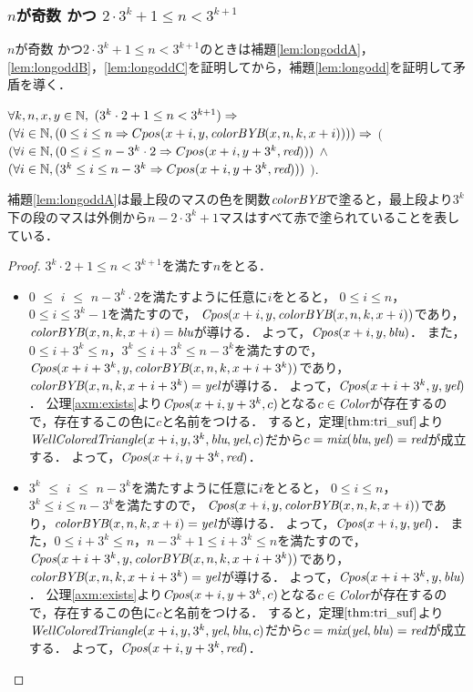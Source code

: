 \subsubsection{$n$が奇数 かつ $2 \cdot 3^{k} + 1 \leq n < 3^{k+1}$}
$n$が奇数 かつ$2 \cdot 3^{k} + 1 \leq n < 3^{k+1}$のときは補題\ref{lem:longoddA}，\ref{lem:longoddB}，\ref{lem:longoddC}を証明してから，補題\ref{lem:longodd}を証明して矛盾を導く．
\begin{lem}[\LongOddA] \label{lem:longoddA}
  $\forall k,n,x,y \in \mathbb{N},$
  $(3^k\cdot2 + 1 \leq n < 3^{k+1}) \Rightarrow$
  $(\forall i \in \mathbb{N},(0 \leq i \leq n \Rightarrow Cpos(x+i,y,\textit{colorBYB}(x,n,k,x+i)))) \Rightarrow$ 
      $($
        $(\forall i \in \mathbb{N},(0 \leq i \leq n - 3^k\cdot2 \Rightarrow Cpos(x+i,y+3^k,\textit{red})))$
        $\land$
        $(\forall i \in \mathbb{N},(3^k \leq i \leq n - 3^k \Rightarrow Cpos(x+i,y+3^k,\textit{red})))$
      $)$.
\end{lem}
補題\ref{lem:longoddA}は最上段のマスの色を関数$\textit{colorBYB}$で塗ると，最上段より$3^k$下の段のマスは外側から$n-2\cdot3^k+1$マスはすべて赤で塗られていることを表している．
\begin{proof}
  $3^k\cdot2 + 1 \leq n < 3^{k+1}$を満たす$n$をとる．
  \begin{itemize}
  \item
    $0$ $\leq$ $i$ $\leq$ $n - 3^k \cdot 2$を満たすように任意に$i$をとると，
    $0 \leq i \leq n$，$0 \leq i \leq 3^k-1$を満たすので，
    $\textit{Cpos}(x+i,y,\textit{colorBYB}(x,n,k,x+i))$であり，$\textit{colorBYB}(x,n,k,x+i)=\textit{blu}$が導ける．
    よって，$\textit{Cpos}(x+i,y,\textit{blu})$．
    また，$0 \leq i+3^k \leq n$，$3^k \leq i+3^k \leq n-3^k$を満たすので，
    $\textit{Cpos}(x+i+3^k,y,\textit{colorBYB}(x,n,k,x+i+3^k))$であり，$\textit{colorBYB}(x,n,k,x+i+3^k)=\textit{yel}$が導ける．
    よって，$\textit{Cpos}(x+i+3^k,y,\textit{yel})$．
    公理\ref{axm:exists}より$\textit{Cpos}(x+i,y+3^k,c)$となる$c\in\textit{Color}$が存在するので，存在するこの色に$c$と名前をつける．
    すると，定理$\ref{thm:tri_suf}$より$\textit{WellColoredTriangle}(x+i,y,3^k,\textit{blu},\textit{yel},c)$だから$c=\textit{mix}(\textit{blu},\textit{yel})=\textit{red}$が成立する．
    よって，$\textit{Cpos}(x+i,y+3^k,\textit{red})$．
  \item
    $3^k$ $\leq$ $i$ $\leq$ $n - 3^k$を満たすように任意に$i$をとると，
    $0 \leq i \leq n$，$3^k \leq i \leq n-3^k$を満たすので，
    $\textit{Cpos}(x+i,y,\textit{colorBYB}(x,n,k,x+i))$であり，$\textit{colorBYB}(x,n,k,x+i)=\textit{yel}$が導ける．
    よって，$\textit{Cpos}(x+i,y,\textit{yel})$．
    また，$0 \leq i+3^k \leq n$，$n-3^k+1 \leq i+3^k \leq n$を満たすので，
    $\textit{Cpos}(x+i+3^k,y,\textit{colorBYB}(x,n,k,x+i+3^k))$であり，$\textit{colorBYB}(x,n,k,x+i+3^k)=\textit{yel}$が導ける．
    よって，$\textit{Cpos}(x+i+3^k,y,\textit{blu})$．
    公理\ref{axm:exists}より$\textit{Cpos}(x+i,y+3^k,c)$となる$c\in\textit{Color}$が存在するので，存在するこの色に$c$と名前をつける．
    すると，定理$\ref{thm:tri_suf}$より$\textit{WellColoredTriangle}(x+i,y,3^k,\textit{yel},\textit{blu},c)$だから$c=\textit{mix}(\textit{yel},\textit{blu})=\textit{red}$が成立する．
    よって，$\textit{Cpos}(x+i,y+3^k,\textit{red})$．
  \end{itemize}
\end{proof}

